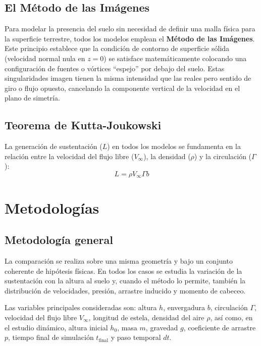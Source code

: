 \documentclass[twocolumn]{article}
\begin{document}
\subsection{El Método de las Imágenes}
Para modelar la presencia del suelo sin necesidad de definir una malla física para la superficie terrestre, todos los modelos emplean el \textbf{Método de las Imágenes}. Este principio establece que la condición de contorno de superficie sólida (velocidad normal nula en $z=0$) se satisface matemáticamente colocando una configuración de fuentes o vórtices ``espejo'' por debajo del suelo. Estas singularidades imagen tienen la misma intensidad que las reales pero sentido de giro o flujo opuesto, cancelando la componente vertical de la velocidad en el plano de simetría.

\subsection{Teorema de Kutta-Joukowski}
La generación de sustentación ($L$) en todos los modelos se fundamenta en la relación entre la velocidad del flujo libre ($V_{\infty}$), la densidad ($\rho$) y la circulación ($\Gamma$):
\begin{equation}
L = \rho V_{\infty} \Gamma b
\end{equation}


\section{Metodologías}

\subsection{Metodología general}
La comparación se realiza sobre una misma geometría y bajo un conjunto coherente de hipótesis físicas. En todos los casos se estudia la variación de la sustentación con la altura al suelo y, cuando el método lo permite, también la distribución de velocidades, presión, arrastre inducido y momento de cabeceo.

Las variables principales consideradas son: altura $h$, envergadura $b$, circulación $\Gamma$, velocidad del flujo libre $V_{\infty}$, longitud de estela, densidad del aire $\rho$, así como, en el estudio dinámico, altura inicial $h_0$, masa $m$, gravedad $g$, coeficiente de arrastre $p$, tiempo final de simulación $t_{\mathrm{final}}$ y paso temporal $dt$.
\end{document}
